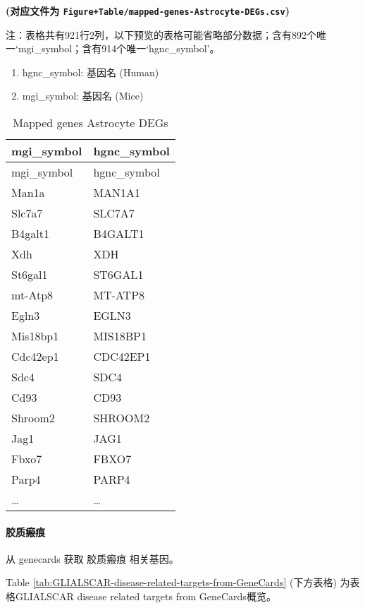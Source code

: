 \documentclass[
]{article}
\providecommand{\tightlist}{%
  \setlength{\itemsep}{0pt}\setlength{\parskip}{0pt}}
\begin{document}
\textbf{(对应文件为 \texttt{Figure+Table/mapped-genes-Astrocyte-DEGs.csv})}

\begin{center}\begin{tcolorbox}[colback=gray!10, colframe=gray!50, width=0.9\linewidth, arc=1mm, boxrule=0.5pt]注：表格共有921行2列，以下预览的表格可能省略部分数据；含有892个唯一`mgi\_symbol；含有914个唯一`hgnc\_symbol'。
\end{tcolorbox}
\end{center}
\begin{center}\begin{tcolorbox}[colback=gray!10, colframe=gray!50, width=0.9\linewidth, arc=1mm, boxrule=0.5pt]\begin{enumerate}\tightlist
\item hgnc\_symbol:  基因名 (Human)
\item mgi\_symbol:  基因名 (Mice)
\end{enumerate}\end{tcolorbox}
\end{center}

\begin{longtable}[]{@{}ll@{}}
\caption{\label{tab:mapped-genes-Astrocyte-DEGs}Mapped genes Astrocyte DEGs}\tabularnewline
\toprule
mgi\_symbol & hgnc\_symbol\tabularnewline
\midrule
\endfirsthead
\toprule
mgi\_symbol & hgnc\_symbol\tabularnewline
\midrule
\endhead
Man1a & MAN1A1\tabularnewline
Slc7a7 & SLC7A7\tabularnewline
B4galt1 & B4GALT1\tabularnewline
Xdh & XDH\tabularnewline
St6gal1 & ST6GAL1\tabularnewline
mt-Atp8 & MT-ATP8\tabularnewline
Egln3 & EGLN3\tabularnewline
Mis18bp1 & MIS18BP1\tabularnewline
Cdc42ep1 & CDC42EP1\tabularnewline
Sdc4 & SDC4\tabularnewline
Cd93 & CD93\tabularnewline
Shroom2 & SHROOM2\tabularnewline
Jag1 & JAG1\tabularnewline
Fbxo7 & FBXO7\tabularnewline
Parp4 & PARP4\tabularnewline
\ldots{} & \ldots{}\tabularnewline
\bottomrule
\end{longtable}

\hypertarget{ux80f6ux8d28ux7622ux75d5}{%
\paragraph{胶质瘢痕}\label{ux80f6ux8d28ux7622ux75d5}}

从 genecards 获取 胶质瘢痕 相关基因。

Table \ref{tab:GLIALSCAR-disease-related-targets-from-GeneCards} (下方表格) 为表格GLIALSCAR disease related targets from GeneCards概览。
\end{document}
